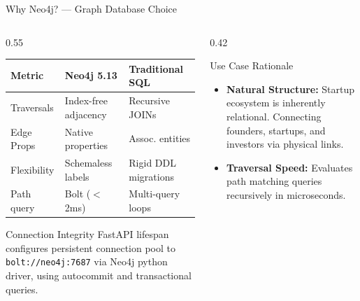 \documentclass[aspectratio=169, 10pt]{beamer}
\begin{document}
\begin{frame}{Why Neo4j? — Graph Database Choice}
  \begin{columns}[T]
    \begin{column}{0.55\textwidth}
      \centering
      \footnotesize
      \begin{tabularx}{\textwidth}{lXX}
        \toprule
        \textbf{Metric} & \textbf{Neo4j 5.13} & \textbf{Traditional SQL} \\
        \midrule
        Traversals & Index-free adjacency & Recursive JOINs \\
        Edge Props & Native properties & Assoc. entities \\
        Flexibility & Schemaless labels & Rigid DDL migrations \\
        Path query & Bolt ($<$2ms) & Multi-query loops \\
        \bottomrule
      \end{tabularx}
      \vspace{1.5mm}
      \begin{infobox}{Connection Integrity}
        FastAPI lifespan configures persistent connection pool to \texttt{bolt://neo4j:7687} via Neo4j python driver, using autocommit and transactional queries.
      \end{infobox}
    \end{column}
    \begin{column}{0.42\textwidth}
      \begin{scard}{Use Case Rationale}
        \begin{itemize}\setlength{\itemsep}{0.5pt}
          \item \textbf{Natural Structure:} Startup ecosystem is inherently relational. Connecting founders, startups, and investors via physical links.
          \item \textbf{Traversal Speed:} Evaluates path matching queries recursively in microseconds.
        \end{itemize}
      \end{scard}
    \end{column}
  \end{columns}
\end{frame}
\end{document}
